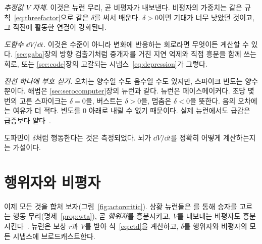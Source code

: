 \emph{추정값 $V$ 자체.} 이것은  뉴런 무리, 곧 비평자가 내보낸다. 비평자의 가중치는 같은 규칙~\eqref{eq:threefactor}으로 같은 $\delta$를 써서 배운다. $\delta>0$이면 기대가 너무 낮았던 것이고, 그 직전에 활동한 연결이 강화된다.

\emph{도함수 $\dd V/\dd t$.} 이것은 수준이 아니라 변화에 반응하는 회로라면 무엇이든 계산할 수 있다. \ref{sec:gaba}장의 방향 검출기처럼  중개자를 거친 지연 억제와 직접 흥분을 함께 쓰는 회로, 또는 \ref{sec:code}장의 고갈되는 시냅스~\eqref{eq:depression}가 그렇다.

\emph{전선 하나에 부호 싣기.} 오차는 양수일 수도 음수일 수도 있지만, 스파이크 빈도는 양수뿐이다. 해법은 \ref{sec:serocomputer}장의  뉴런과 같다.  뉴런은 페이스메이커다. 초당 몇 번의 고른 스파이크는 $\delta=0$을, 버스트는 $\delta>0$을, 멈춤은 $\delta<0$을 뜻한다. 음의 오차에는 여유가 더 적다. 빈도를 0 아래로 내릴 수 없기 때문이다. 실제  뉴런에서도 급감은 급증보다 얕다~\cite{Bayer2005}.

도파민이 $\delta$처럼 행동한다는 것은 측정되었다. 뇌가 $\dd V/\dd t$를 정확히 어떻게 계산하는지는 가설이다.

\section{행위자와 비평자}

이제 모든 것을 합쳐 보자(그림~\ref{fig:actorcritic}). 상황 뉴런들은 를 통해 승자를 고르는 행동 무리(명제~\ref{prop:wta}), 곧 \emph{행위자}를 흥분시키고, $V$를 내보내는 비평자도 흥분시킨다~\cite{SuttonBarto2018}.  뉴런은 보상 $r$과 $V$를 받아 식~\eqref{eq:ctd}을 계산하고, $\delta$를 행위자와 비평자의 모든 시냅스에 브로드캐스트한다.

